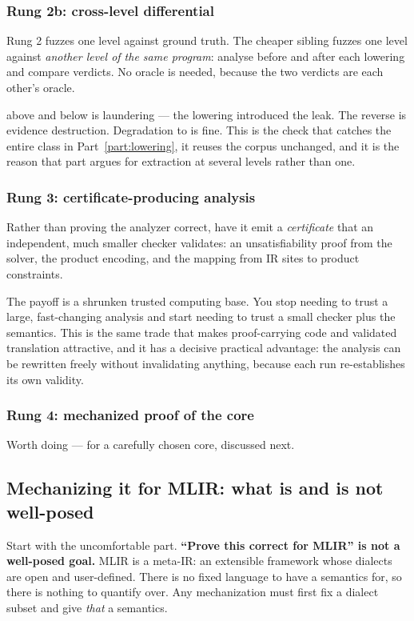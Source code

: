 \subsubsection*{Rung 2b: cross-level differential}

Rung 2 fuzzes one level against ground truth. The cheaper sibling fuzzes one
level against \emph{another level of the same program}: analyse before and after
each lowering and compare verdicts. No oracle is needed, because the two verdicts
are each other's oracle.

\Verified{} above and \Unsafe{} below is laundering --- the lowering introduced
the leak. The reverse is evidence destruction. Degradation to \Unknown{} is
fine. This is the check that catches the entire class in
Part~\ref{part:lowering}, it reuses the corpus unchanged, and it is the reason
that part argues for extraction at several levels rather than one.

\subsubsection*{Rung 3: certificate-producing analysis}

Rather than proving the analyzer correct, have it emit a \emph{certificate} that
an independent, much smaller checker validates: an unsatisfiability proof from the
solver, the product encoding, and the mapping from IR sites to product
constraints.

The payoff is a shrunken trusted computing base. You stop needing to trust a
large, fast-changing analysis and start needing to trust a small checker plus the
semantics. This is the same trade that makes proof-carrying code and validated
translation attractive, and it has a decisive practical advantage: the analysis
can be rewritten freely without invalidating anything, because each run
re-establishes its own validity.

\subsubsection*{Rung 4: mechanized proof of the core}

Worth doing --- for a carefully chosen core, discussed next.

\subsection{Mechanizing it for MLIR: what is and is not well-posed}

Start with the uncomfortable part. \textbf{``Prove this correct for MLIR'' is not
a well-posed goal.} MLIR is a meta-IR: an extensible framework whose dialects are
open and user-defined. There is no fixed language to have a semantics for, so
there is nothing to quantify over. Any mechanization must first fix a dialect
subset and give \emph{that} a semantics.

